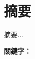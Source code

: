 \documentclass[class=NCU_thesis, crop=false]{standalone}
\begin{document}
\chapter{摘要}

摘要...

\vspace{2em}
\noindent \textbf{關鍵字：} \keywordsZh{} %
\end{document}
